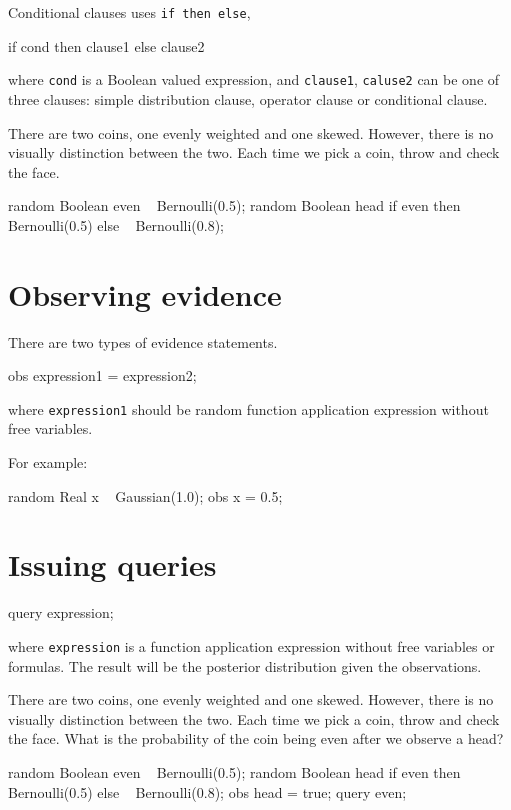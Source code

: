 \documentclass[12pt]{article}
\begin{document}
Conditional clauses uses \texttt{if then else}, 
\begin{blogcode}
if cond then clause1
else clause2
\end{blogcode}
where \texttt{cond} is a Boolean valued expression, and \texttt{clause1}, \texttt{caluse2} can be one of three clauses: simple distribution clause, operator clause or conditional clause. 

\begin{example}
There are two coins, one evenly weighted and one skewed. However, there is no visually distinction between the two. Each time we pick a coin, throw and check the face.
\end{example}
\begin{blogcode}
random Boolean even ~ Bernoulli(0.5);
random Boolean head 
  if even then ~ Bernoulli(0.5)
  else ~ Bernoulli(0.8);
\end{blogcode}

\section{Observing evidence}
There are two types of evidence statements.
\begin{blogcode}
obs expression1 = expression2;
\end{blogcode}
where \texttt{expression1} should be random function application expression without free variables. 

For example:
\begin{blogcode}
random Real x ~ Gaussian(1.0);
obs x = 0.5;
\end{blogcode}

\section{Issuing queries}
\begin{blogcode}
query expression;
\end{blogcode}
where \texttt{expression} is a function application expression without free variables or formulas. The result will be the posterior distribution given the observations. 

\begin{example}
There are two coins, one evenly weighted and one skewed. However, there is no visually distinction between the two. Each time we pick a coin, throw and check the face. What is the probability of the coin being even after we observe a head?
\end{example}
\begin{blogcode}
random Boolean even ~ Bernoulli(0.5);
random Boolean head 
  if even then ~ Bernoulli(0.5)
  else ~ Bernoulli(0.8);
obs head = true;
query even;
\end{blogcode}
\end{document}

